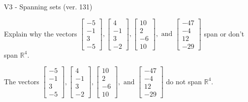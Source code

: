 \begin{exercise}
  \begin{exerciseTitle}V3 - Spanning sets (ver. 131)\end{exerciseTitle}
  \begin{exerciseStatement}
    Explain why the vectors \(\left[\begin{array}{r}
-5 \\
-1 \\
3 \\
-5
\end{array}\right] , \left[\begin{array}{r}
4 \\
-1 \\
3 \\
-2
\end{array}\right] , \left[\begin{array}{r}
10 \\
2 \\
-6 \\
10
\end{array}\right] , \text{ and } \left[\begin{array}{r}
-47 \\
-4 \\
12 \\
-29
\end{array}\right]\) span or don't span \(\mathbb{R}^4\). 
	


  \end{exerciseStatement}
  \begin{exerciseAnswer}
   The vectors \(\left[\begin{array}{r}
-5 \\
-1 \\
3 \\
-5
\end{array}\right] , \left[\begin{array}{r}
4 \\
-1 \\
3 \\
-2
\end{array}\right] , \left[\begin{array}{r}
10 \\
2 \\
-6 \\
10
\end{array}\right] , \text{ and } \left[\begin{array}{r}
-47 \\
-4 \\
12 \\
-29
\end{array}\right]\) 
  	 do not  
	span \(\mathbb{R}^4\).
  


  \end{exerciseAnswer}
\end{exercise}